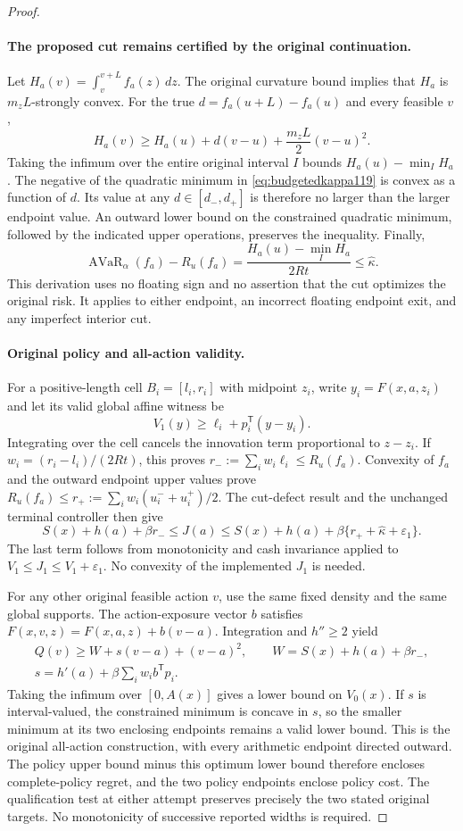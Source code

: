 \begin{proof}
\paragraph{The proposed cut remains certified by the original continuation.}
Let $H_a(v)=\int_v^{v+L}f_a(z)\,dz$.  The original curvature bound
implies that $H_a$ is $m_zL$-strongly convex.  For the true
$d=f_a(u+L)-f_a(u)$ and every feasible $v$,
\[
 H_a(v)\ge H_a(u)+d(v-u)+\frac{m_zL}{2}(v-u)^2.
\]
Taking the infimum over the entire original interval $I$ bounds
$H_a(u)-\min_IH_a$.  The negative of the quadratic minimum in
\eqref{eq:budgetedkappa119} is convex as a function of $d$.
Its value at any $d\in[d_-,d_+]$ is therefore no larger than the
larger endpoint value.  An outward lower bound on the constrained
quadratic minimum, followed by the indicated upper operations,
preserves the inequality.  Finally,
\[
 \operatorname{AVaR}_\alpha(f_a)-R_u(f_a)
       =\frac{H_a(u)-\min_I H_a}{2Rt}
       \le\widehat\kappa.
\]
This derivation uses no floating sign and no assertion that the cut
optimizes the original risk.  It applies to either endpoint, an
incorrect floating endpoint exit, and any imperfect interior cut.

\paragraph{Original policy and all-action validity.}
For a positive-length cell $B_i=[l_i,r_i]$ with midpoint $z_i$,
write $y_i=F(x,a,z_i)$ and let its valid global affine witness be
\[
 V_1(y)\ge\ell_i+p_i^{\mathsf T}(y-y_i).
\]
Integrating over the cell cancels the innovation term proportional
to $z-z_i$.  If $w_i=(r_i-l_i)/(2Rt)$, this proves
$r_-:=\sum_iw_i\ell_i\le R_u(f_a)$.  Convexity of $f_a$ and
the outward endpoint upper values prove
$R_u(f_a)\le r_+:=\sum_iw_i(u_i^-+u_i^+)/2$.
The cut-defect result and the unchanged terminal controller then give
\[
 S(x)+h(a)+\beta r_-
 \le J(a)
 \le S(x)+h(a)+\beta\{r_++\widehat\kappa+\varepsilon_1\}.
\]
The last term follows from monotonicity and cash invariance applied
to $V_1\le J_1\le V_1+\varepsilon_1$.  No convexity of the
implemented $J_1$ is needed.

For any other original feasible action $v$, use the same fixed
density and the same global supports.  The action-exposure vector
$b$ satisfies $F(x,v,z)=F(x,a,z)+b(v-a)$.  Integration and
$h''\ge2$ yield
\[
\begin{gathered}
 Q(v)\ge W+s(v-a)+(v-a)^2,\qquad W=S(x)+h(a)+\beta r_-,\\
 s=h'(a)+\beta\sum_iw_i b^{\mathsf T}p_i.
\end{gathered}
\]
Taking the infimum over $[0,A(x)]$ gives a lower bound on
$V_0(x)$.  If $s$ is interval-valued, the constrained minimum is
concave in $s$, so the smaller minimum at its two enclosing
endpoints remains a valid lower bound.  This is the original
all-action construction, with every arithmetic endpoint directed
outward.  The policy upper bound minus this optimum lower bound
therefore encloses complete-policy regret, and the two policy
endpoints enclose policy cost.  The qualification test at either
attempt preserves precisely the two stated original targets.
No monotonicity of successive reported widths is required.


\end{proof}
